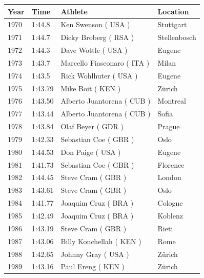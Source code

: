 \documentclass{article}
\begin{document}
\begin{tabular}{llll}
\toprule
Year & Time & Athlete & Location \\
\midrule
1970 & 1:44.8 & Ken Swenson ( USA ) & Stuttgart \\
1971 & 1:44.7 & Dicky Broberg ( RSA ) & Stellenbosch \\
1972 & 1:44.3 & Dave Wottle ( USA ) & Eugene \\
1973 & 1:43.7 & Marcello Fiasconaro ( ITA ) & Milan \\
1974 & 1:43.5 & Rick Wohlhuter ( USA ) & Eugene \\
1975 & 1:43.79 & Mike Boit ( KEN ) & Zürich \\
1976 & 1:43.50 & Alberto Juantorena ( CUB ) & Montreal \\
1977 & 1:43.44 & Alberto Juantorena ( CUB ) & Sofia \\
1978 & 1:43.84 & Olaf Beyer ( GDR ) & Prague \\
1979 & 1:42.33 & Sebastian Coe ( GBR ) & Oslo \\
1980 & 1:44.53 & Don Paige ( USA ) & Eugene \\
1981 & 1:41.73 & Sebastian Coe ( GBR ) & Florence \\
1982 & 1:44.45 & Steve Cram ( GBR ) & London \\
1983 & 1:43.61 & Steve Cram ( GBR ) & Oslo \\
1984 & 1:41.77 & Joaquim Cruz ( BRA ) & Cologne \\
1985 & 1:42.49 & Joaquim Cruz ( BRA ) & Koblenz \\
1986 & 1:43.19 & Steve Cram ( GBR ) & Rieti \\
1987 & 1:43.06 & Billy Konchellah ( KEN ) & Rome \\
1988 & 1:42.65 & Johnny Gray ( USA ) & Zürich \\
1989 & 1:43.16 & Paul Ereng ( KEN ) & Zürich \\
\bottomrule
\end{tabular}
\end{document}
